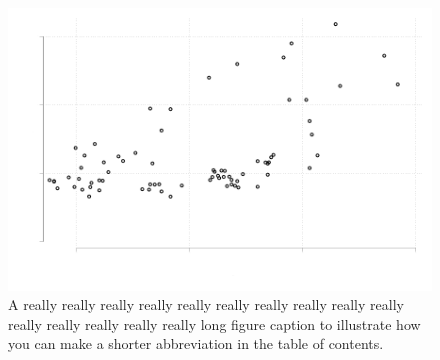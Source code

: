 \documentclass[12pt]{article}%
\begin{document}

  \begin{singlespace}
  \tableofcontents
   \listoftables
   \listoffigures
  \end{singlespace}
\newpage

 \FloatBarrier
\begin{figure}[h]
	\caption[Abbreviated Caption]{A really really really really really really really really really really really really really really really long figure caption to illustrate how you can make a shorter abbreviation in the table of contents.}
	  \centering
	  \includegraphics[width=\linewidth]{../output/simple_scatter.pdf}

	\label{fig:simple_scatter}
\end{figure}
\end{document}
